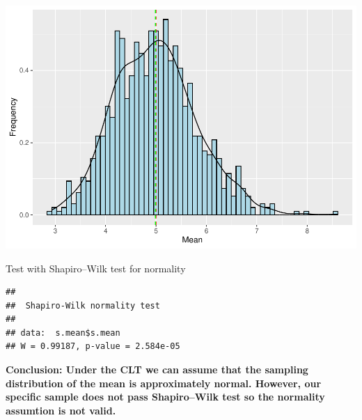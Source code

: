 \documentclass[]{article}
\newenvironment{Shaded}{\begin{snugshade}}{\end{snugshade}}
\newcommand{\KeywordTok}[1]{\textcolor[rgb]{0.13,0.29,0.53}{\textbf{#1}}}
\newcommand{\NormalTok}[1]{#1}
\newcommand{\OperatorTok}[1]{\textcolor[rgb]{0.81,0.36,0.00}{\textbf{#1}}}
\begin{document}
\includegraphics{IS_final_assignment_part1_files/figure-latex/unnamed-chunk-6-1.pdf}

Test with Shapiro--Wilk test for normality

\begin{Shaded}
\end{Shaded}

\begin{verbatim}
## 
##  Shapiro-Wilk normality test
## 
## data:  s.mean$s.mean
## W = 0.99187, p-value = 2.584e-05
\end{verbatim}

\textbf{Conclusion: Under the CLT we can assume that the sampling
distribution of the mean is approximately normal. However, our specific
sample does not pass Shapiro--Wilk test so the normality assumtion is
not valid.}
\end{document}

